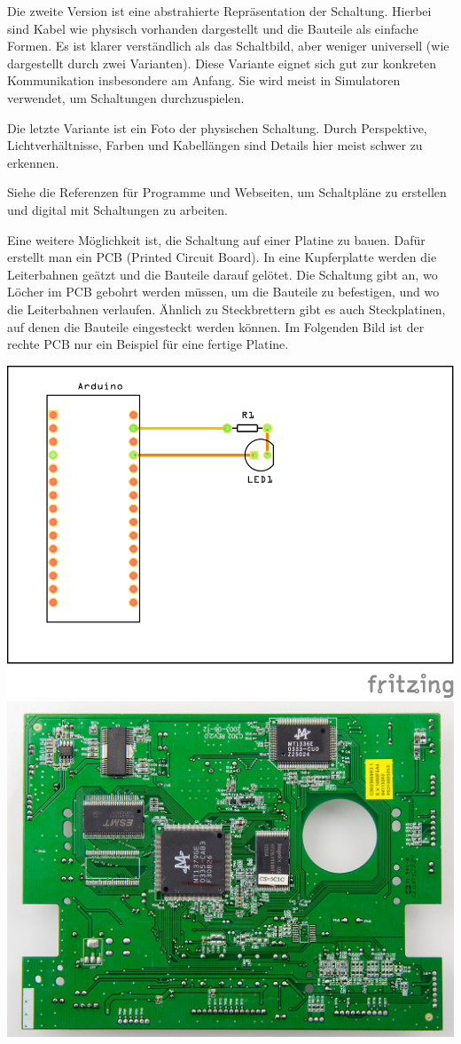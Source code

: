 \documentclass[a4paper,12pt]{book}
\begin{document}
Die zweite Version ist eine abstrahierte Repräsentation der Schaltung.
Hierbei sind Kabel wie physisch vorhanden dargestellt und die Bauteile als einfache Formen.
Es ist klarer verständlich als das Schaltbild, aber weniger universell (wie dargestellt durch zwei Varianten).
Diese Variante eignet sich gut zur konkreten Kommunikation insbesondere am Anfang.
Sie wird meist in Simulatoren verwendet, um Schaltungen durchzuspielen.

Die letzte Variante ist ein Foto der physischen Schaltung.
Durch Perspektive, Lichtverhältnisse, Farben und Kabellängen sind Details
hier meist schwer zu erkennen.

Siehe die Referenzen für Programme und Webseiten, um Schaltpläne zu erstellen
und digital mit Schaltungen zu arbeiten.

Eine weitere Möglichkeit ist, die Schaltung auf einer Platine zu bauen.
Dafür erstellt man ein PCB (Printed Circuit Board).
In eine Kupferplatte werden die Leiterbahnen geätzt und die Bauteile darauf gelötet.
Die Schaltung gibt an, wo Löcher im PCB gebohrt werden müssen, um die Bauteile zu befestigen,
und wo die Leiterbahnen verlaufen.
Ähnlich zu Steckbrettern gibt es auch Steckplatinen, auf denen die Bauteile eingesteckt werden können.
Im Folgenden Bild ist der rechte PCB nur ein Beispiel für eine fertige Platine.
\begin{center}
  \includegraphics[width=.49\textwidth]{schaltung/led/pcb.png}%
  \includegraphics[width=.49\textwidth]{images/pcb.jpg}%
\end{center}
\end{document}
